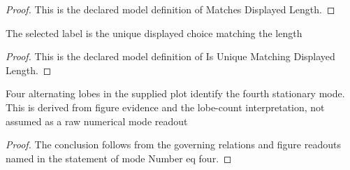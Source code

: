 \begin{proof}
  This is the declared model definition of Matches Displayed Length.
\end{proof}
\begin{definition}
  \label{def:physics:phyx-mini-0508:phyxminiproblems-problemphyxmini0508-isuniquematchingdisplayedlength}
  The selected label is the unique displayed choice matching the length
\end{definition}
\begin{proof}
  This is the declared model definition of Is Unique Matching Displayed Length.
\end{proof}
\begin{lemma}
  \label{lem:physics:phyx-mini-0508:phyxminiproblems-problemphyxmini0508-modenumber-eq-four}
  Four alternating lobes in the supplied plot identify the fourth stationary mode. This is derived from figure evidence and the lobe-count interpretation, not assumed as a raw numerical mode readout
\end{lemma}
\begin{proof}
  The conclusion follows from the governing relations and figure readouts named in the statement of mode Number eq four.
\end{proof}
